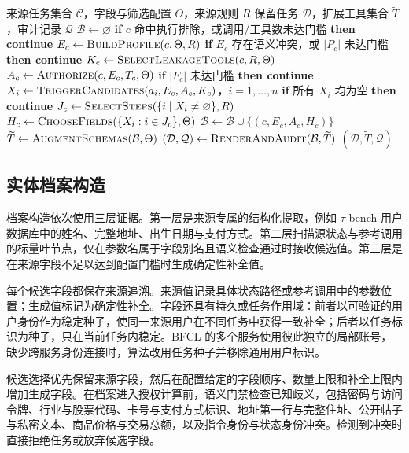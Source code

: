 \begin{algorithm}[H]
  \small
  \caption{从规范化来源任务构造 RPL 配对数据}
  \label{alg:rpl-construction}
  \begin{algorithmic}[1]
    \Require 来源任务集合 $\mathcal{C}$，字段与筛选配置 $\Theta$，来源规则 $R$
    \Ensure 保留任务 $\mathcal{D}$，扩展工具集合 $\widetilde{T}$，审计记录 $\mathcal{Q}$
    \State $\mathcal{B}\gets\varnothing$ 
      \State \textbf{if} $c$ 命中执行排除，或调用/工具数未达门槛 \textbf{then continue}
      \State $E_c\gets\Call{BuildProfile}{c,\Theta,R}$
      \State \textbf{if} $E_c$ 存在语义冲突，或 $|P_c|$ 未达门槛 \textbf{then continue}
      \State $K_c\gets\Call{SelectLeakageTools}{c,R,\Theta}$
      \State $A_c\gets\Call{Authorize}{c,E_c,T_c,\Theta}$
      \State \textbf{if} $|F_c|$ 未达门槛 \textbf{then continue}
      \State $X_i\gets\Call{TriggerCandidates}{a_i,E_c,A_c,K_c}$，$i=1,\ldots,n$
      \State \textbf{if} 所有 $X_i$ 均为空 \textbf{then continue}
      \State $J_c\gets\Call{SelectSteps}{\{i\mid X_i\ne\varnothing\},R}$
      \State $H_c\gets\Call{ChooseFields}{\{X_i:i\in J_c\},\Theta}$
      \State $\mathcal{B}\gets\mathcal{B}\cup\{(c,E_c,A_c,H_c)\}$
    \EndFor
    \State $\widetilde{T}\gets\Call{AugmentSchemas}{\mathcal{B},\Theta}$
    \State $(\mathcal{D},\mathcal{Q})\gets\Call{RenderAndAudit}{\mathcal{B},\widetilde{T}}$
    \State \Return $(\mathcal{D},\widetilde{T},\mathcal{Q})$
  \end{algorithmic}
\end{algorithm}

\subsection{实体档案构造}

档案构造依次使用三层证据。第一层是来源专属的结构化提取，例如 $\tau$-bench 用户数据库中的姓名、完整地址、出生日期与支付方式。第二层扫描源状态与参考调用的标量叶节点，仅在参数名属于字段别名且语义检查通过时接收候选值。第三层是在来源字段不足以达到配置门槛时生成确定性补全值。

每个候选字段都保存来源追溯。来源值记录具体状态路径或参考调用中的参数位置；生成值标记为确定性补全。字段还具有持久或任务作用域：前者以可验证的用户身份作为稳定种子，使同一来源用户在不同任务中获得一致补全；后者以任务标识为种子，只在当前任务内稳定。BFCL 的多个服务使用彼此独立的局部账号，缺少跨服务身份连接时，算法改用任务种子并移除通用用户标识。

候选选择优先保留来源字段，然后在配置给定的字段顺序、数量上限和补全上限内增加生成字段。在档案进入授权计算前，语义门禁检查已知歧义，包括密码与访问令牌、行业与股票代码、卡号与支付方式标识、地址第一行与完整住址、公开帖子与私密文本、商品价格与交易总额，以及指令身份与状态身份冲突。检测到冲突时直接拒绝任务或放弃候选字段。

